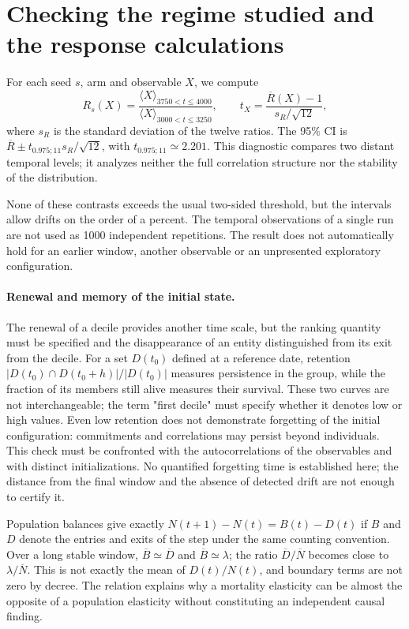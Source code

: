 \appendix
\FloatBarrier

\clearpage
\section{Checking the regime studied and the response calculations}\label{sec:stationnarite}
For each seed $s$, arm and observable $X$, we compute
\[
 R_s(X)=\frac{\langle X\rangle_{3750<t\le4000}}
                  {\langle X\rangle_{3000<t\le3250}},\qquad
 t_X=\frac{\overline R(X)-1}{s_R/\sqrt{12}},
\]
where $s_R$ is the standard deviation of the twelve ratios. The 95\% CI is
$\overline R\pm t_{0.975;11}s_R/\sqrt{12}$, with
$t_{0.975;11}\simeq2.201$.
This diagnostic compares two distant temporal levels; it analyzes
neither the full correlation structure nor the stability of the distribution.



None of these contrasts exceeds the usual two-sided threshold, but the
intervals allow drifts on the order of a percent. The temporal observations
of a single run are not used as 1000 independent repetitions.
The result does not automatically hold for an earlier window,
another observable or an unpresented exploratory configuration.

\paragraph{Renewal and memory of the initial state.}
The renewal of a decile provides another time scale, but
the ranking quantity must be specified and the disappearance of an
entity distinguished from its exit from the decile. For a set $D(t_0)$
defined at a reference date, retention
$|D(t_0)\cap D(t_0+h)|/|D(t_0)|$ measures persistence in the group,
while the fraction of its members still alive measures their survival.
These two curves are not interchangeable; the term "first
decile" must specify whether it denotes low or high values.
Even low retention does not demonstrate forgetting of the
initial configuration: commitments and correlations may persist beyond
individuals. This check must be confronted with the autocorrelations of
the observables and with distinct initializations. No quantified
forgetting time is established here; the distance from the final window and
the absence of detected drift are not enough to certify it.

Population balances give exactly
$N(t+1)-N(t)=B(t)-D(t)$ if $B$ and $D$ denote the entries and exits
of the step under the same counting convention. Over a long stable window,
$\overline B\simeq\overline D$ and $\overline B\simeq\lambda$;
the ratio $\overline D/\overline N$ becomes close to
$\lambda/\overline N$. This is not exactly the mean of
$D(t)/N(t)$, and boundary terms are not zero by decree.
The relation explains why a mortality elasticity can be
almost the opposite of a population elasticity without constituting an
independent causal finding.

